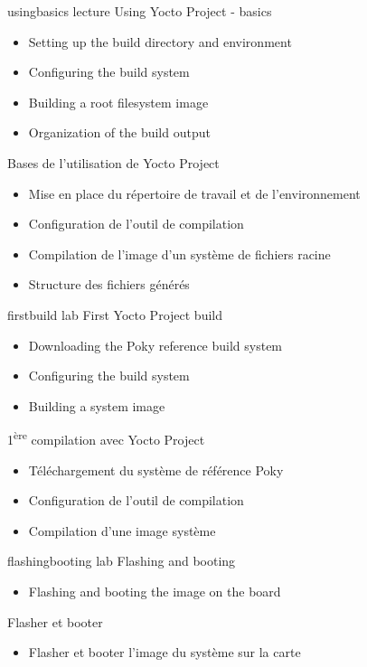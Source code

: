 {usingbasics}
{lecture}
{Using Yocto Project - basics}
{
  \begin{itemize}
  \item Setting up the build directory and environment
  \item Configuring the build system
  \item Building a root filesystem image
  \item Organization of the build output
  \end{itemize}
}
{Bases de l'utilisation de Yocto Project}
{
  \begin{itemize}
  \item Mise en place du répertoire de travail et de l'environnement
  \item Configuration de l'outil de compilation
  \item Compilation de l'image d'un système de fichiers racine
  \item Structure des fichiers générés
  \end{itemize}
}

{firstbuild}
{lab}
{First Yocto Project build}
{
  \begin{itemize}
  \item Downloading the Poky reference build system
  \item Configuring the build system
  \item Building a system image
 \end{itemize}
}
{1\textsuperscript{ère} compilation avec Yocto Project}
{
  \begin{itemize}
  \item Téléchargement du système de référence Poky
  \item Configuration de l'outil de compilation
  \item Compilation d'une image système
 \end{itemize}
}

{flashingbooting}
{lab}
{Flashing and booting}
{
  \begin{itemize}
  \item Flashing and booting the image on the board
  \end{itemize}
}
{Flasher et booter}
{
  \begin{itemize}
  \item Flasher et booter l'image du système sur la carte
  \end{itemize}
}

